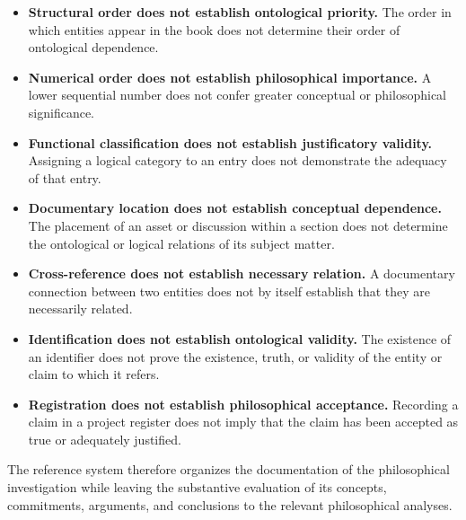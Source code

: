 \begin{itemize}
    \item \textbf{Structural order does not establish
          ontological priority.}
          The order in which entities appear in the book
          does not determine their order of ontological
          dependence.

    \item \textbf{Numerical order does not establish
          philosophical importance.}
          A lower sequential number does not confer
          greater conceptual or philosophical significance.

    \item \textbf{Functional classification does not
          establish justificatory validity.}
          Assigning a logical category to an entry does
          not demonstrate the adequacy of that entry.

    \item \textbf{Documentary location does not establish
          conceptual dependence.}
          The placement of an asset or discussion within
          a section does not determine the ontological
          or logical relations of its subject matter.

    \item \textbf{Cross-reference does not establish
          necessary relation.}
          A documentary connection between two entities
          does not by itself establish that they are
          necessarily related.

    \item \textbf{Identification does not establish
          ontological validity.}
          The existence of an identifier does not prove
          the existence, truth, or validity of the
          entity or claim to which it refers.

    \item \textbf{Registration does not establish
          philosophical acceptance.}
          Recording a claim in a project register does
          not imply that the claim has been accepted
          as true or adequately justified.
\end{itemize}

The reference system therefore organizes the documentation
of the philosophical investigation while leaving the
substantive evaluation of its concepts, commitments,
arguments, and conclusions to the relevant philosophical
analyses.



